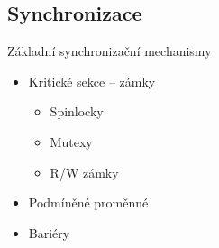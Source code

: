\subsection*{Synchronizace}
\frame{\subsectionpage}



\begin{frame}{Základní synchronizační mechanismy}

  \begin{itemize}
    \item Kritické sekce -- zámky
    \begin{itemize}
      \item Spinlocky
      \item Mutexy
      \item R/W zámky
    \end{itemize}

    \pause

    \item Podmíněné proměnné
    \item Bariéry
  \end{itemize}

\end{frame}

